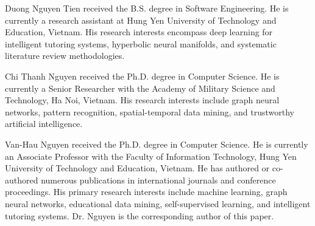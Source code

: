 \documentclass[journal]{IEEEtran}
\begin{document}
\begin{IEEEbiographynophoto}{Duong Nguyen Tien}
received the B.S. degree in Software Engineering. He is currently a research assistant at Hung Yen University of Technology and Education, Vietnam. His research interests encompass deep learning for intelligent tutoring systems, hyperbolic neural manifolds, and systematic literature review methodologies.
\end{IEEEbiographynophoto}

\begin{IEEEbiographynophoto}{Chi Thanh Nguyen}
received the Ph.D. degree in Computer Science. He is currently a Senior Researcher with the Academy of Military Science and Technology, Ha Noi, Vietnam. His research interests include graph neural networks, pattern recognition, spatial-temporal data mining, and trustworthy artificial intelligence.
\end{IEEEbiographynophoto}

\begin{IEEEbiographynophoto}{Van-Hau Nguyen}
received the Ph.D. degree in Computer Science. He is currently an Associate Professor with the Faculty of Information Technology, Hung Yen University of Technology and Education, Vietnam. He has authored or co-authored numerous publications in international journals and conference proceedings. His primary research interests include machine learning, graph neural networks, educational data mining, self-supervised learning, and intelligent tutoring systems. Dr. Nguyen is the corresponding author of this paper.
\end{IEEEbiographynophoto}
\end{document}
